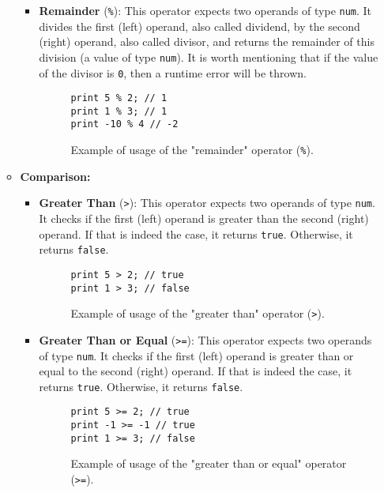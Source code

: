 \begin{itemize}
\begin{itemize}
\begin{itemize}
                    
                    \item \textbf{Remainder} (\texttt{\%}): This operator expects two operands of type \texttt{num}. It divides the first (left) operand, also called dividend, by the second (right) operand, also called divisor, and returns the remainder of this division (a value of type \texttt{num}). It is worth mentioning that if the value of the divisor is \texttt{0}, then a runtime error will be thrown.
                    \begin{figure}[H]
                        \centering
                        \begin{lstlisting}
print 5 % 2; // 1
print 1 % 3; // 1
print -10 % 4 // -2
                        \end{lstlisting}
                        \caption{Example of usage of the "remainder" operator (\texttt{\%}).}
                    \end{figure}
                
                
                \end{itemize}
                
            \item \textbf{Comparison:}
                \begin{itemize}
                    \item \textbf{Greater Than} (\texttt{>}): This operator expects two operands of type \texttt{num}. It checks if the first (left) operand is greater than the second (right) operand. If that is indeed the case, it returns \texttt{true}. Otherwise, it returns \texttt{false}.
                    \begin{figure}[H]
                        \centering
                        \begin{lstlisting}
print 5 > 2; // true
print 1 > 3; // false
                        \end{lstlisting}
                        \caption{Example of usage of the "greater than" operator (\texttt{>}).}
                    \end{figure}

                    \item \textbf{Greater Than or Equal} (\texttt{>=}): This operator expects two operands of type \texttt{num}. It checks if the first (left) operand is greater than or equal to the second (right) operand. If that is indeed the case, it returns \texttt{true}. Otherwise, it returns \texttt{false}.
                    \begin{figure}[H]
                        \centering
                        \begin{lstlisting}
print 5 >= 2; // true
print -1 >= -1 // true
print 1 >= 3; // false
                        \end{lstlisting}
                        \caption{Example of usage of the "greater than or equal" operator (\texttt{>=}).}
                    \end{figure}


\end{itemize}
\end{itemize}
\end{itemize}
